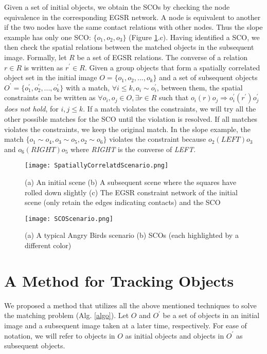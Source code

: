 \documentclass[letterpaper]{article}
\begin{document}
Given a set of initial objects, we obtain the SCOs by checking the node equivalence in the corresponding EGSR network. A node is equivalent to another if the two nodes have the same contact relations with other nodes. Thus the slope example has only one SCO: $\{o_1, o_2, o_3\}$ (Figure \ref{SCOExample_2}.c). Having identified a SCO, we then check the spatial relations between the matched objects in the subsequent image. Formally, let $R$ be a set of EGSR relations. The converse of a relation $r \in R$ is written as $r^{\prime} \in R$. Given a group objects that form a spatially correlated object set in the initial image $O = \{o_1, o_2, ... , o_k\}$ and a set of subsequent objects $O^\prime = \{o^{\prime}_1, o^{\prime}_2, ..., o^{\prime}_k \}$ with a match, $\forall i\leq k, o_i \sim o^{\prime}_i$, between them, the spatial constraints can be written as $\forall o_i,o_j\in O, \exists r\in R$ such that $o_i (r) o_j \Rightarrow o^{\prime}_i (r^{\prime}) o^{\prime}_j$ \emph{does not hold}, for $i,j \leq k$. If a match violates the constraints, we will try all the other possible matches for the SCO until the violation is resolved. If all matches violates the constraints, we keep the original match. In the slope example, the match $\{o_1\sim o_4, o_3\sim o_5, o_2 \sim o_6\}$ violates the constraint because $o_2(LEFT)o_3$ and $o_6(RIGHT)o_5$ where \emph{RIGHT} is the converse of \emph{LEFT}.

\begin{figure}[h!]
\centering\texttt{[image: SpatiallyCorrelatdScenario.png]}\caption{(a) An initial scene (b) A subsequent scene where the squares have rolled down slightly (c) The EGSR constraint network of the initial scene (only retain the edges indicating contacts) and the SCO}
\label{SCOExample_2}
\end{figure}

\begin{figure}[h!]
\centering\texttt{[image: SCOScenario.png]}\caption{(a) A typical Angry Birds scenario (b) SCOs (each highlighted by a different color)}
\label{SCOExample}
\end{figure}


\section{A Method for Tracking Objects}

We proposed a method that utilizes all the above mentioned techniques to solve the matching problem (Alg. \ref{algo}). Let $O$ and $O^{\prime}$ be a set of objects in an initial image and a subsequent image taken at a later time, respectively. For ease of notation, we will refer to objects in $O$ as initial objects and objects in $O^{\prime}$ as subsequent objects.
\end{document}
